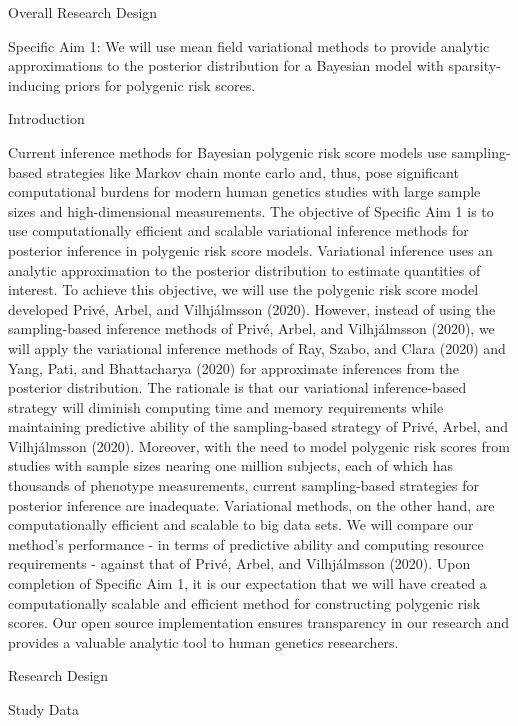 \documentclass[
  11pt,
  letterpaper,
  DIV=11,
  numbers=noendperiod]{scrartcl}
\begin{document}
Overall Research Design

Specific Aim 1: We will use mean field variational methods to provide
analytic approximations to the posterior distribution for a Bayesian
model with sparsity-inducing priors for polygenic risk scores.

Introduction

Current inference methods for Bayesian polygenic risk score models use
sampling-based strategies like Markov chain monte carlo and, thus, pose
significant computational burdens for modern human genetics studies with
large sample sizes and high-dimensional measurements. The objective of
Specific Aim 1 is to use computationally efficient and scalable
variational inference methods for posterior inference in polygenic risk
score models. Variational inference uses an analytic approximation to
the posterior distribution to estimate quantities of interest. To
achieve this objective, we will use the polygenic risk score model
developed Privé, Arbel, and Vilhjálmsson (2020). However, instead of
using the sampling-based inference methods of Privé, Arbel, and
Vilhjálmsson (2020), we will apply the variational inference methods of
Ray, Szabo, and Clara (2020) and Yang, Pati, and Bhattacharya (2020) for
approximate inferences from the posterior distribution. The rationale is
that our variational inference-based strategy will diminish computing
time and memory requirements while maintaining predictive ability of the
sampling-based strategy of Privé, Arbel, and Vilhjálmsson (2020).
Moreover, with the need to model polygenic risk scores from studies with
sample sizes nearing one million subjects, each of which has thousands
of phenotype measurements, current sampling-based strategies for
posterior inference are inadequate. Variational methods, on the other
hand, are computationally efficient and scalable to big data sets. We
will compare our method's performance - in terms of predictive ability
and computing resource requirements - against that of Privé, Arbel, and
Vilhjálmsson (2020). Upon completion of Specific Aim 1, it is our
expectation that we will have created a computationally scalable and
efficient method for constructing polygenic risk scores. Our open source
implementation ensures transparency in our research and provides a
valuable analytic tool to human genetics researchers.

Research Design

Study Data
\end{document}
